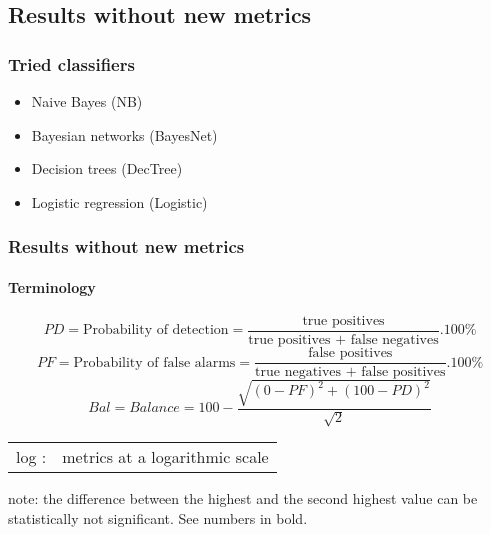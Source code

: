 \subsection{Results without new metrics}
\begin{frame}
 \frametitle{Tried classifiers}
 \begin{itemize}
  \item Naive Bayes (NB)
  \item Bayesian networks (BayesNet)
  \item Decision trees (DecTree)
  \item Logistic regression (Logistic)
 \end{itemize}
\end{frame}

\begin{frame}
 \frametitle{Results without new metrics}
 \framesubtitle{Terminology}
 $$PD = \text{Probability of detection} = \frac{\text{true positives}}{\text{true positives + false negatives}} . 100\%$$
 \vspace{0.1cm}
 $$PF = \text{Probability of false alarms} = \frac{\text{false positives}}{\text{true negatives + false positives}} . 100\%$$
 \vspace{0.1cm}
 $$Bal = Balance = 100 - \frac{\sqrt{(0-PF)^2 + (100-PD)^2}}{\sqrt{2}}$$
 \begin{center}
  \begin{tabular}{ll}
   log : & metrics at a logarithmic scale
  \end{tabular}
 \end{center}
 \small note: the difference between the highest and the second highest value can be statistically not significant. See numbers in bold. \normalsize
\end{frame}

